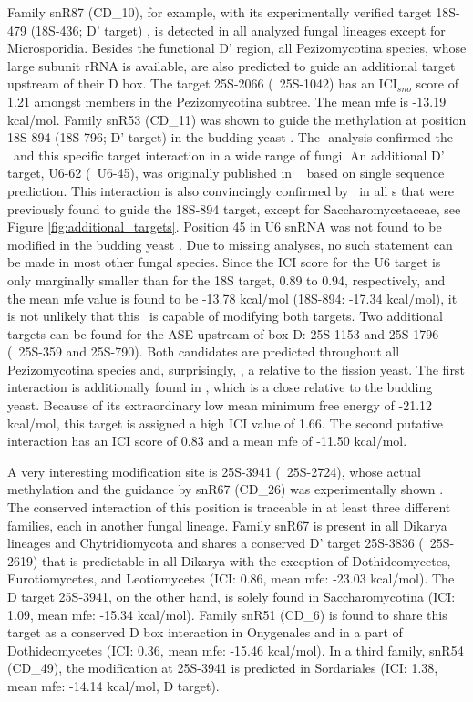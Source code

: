 Family snR87 (CD\_10), for example, with its experimentally verified target
18S-479 (18S-436; D' target) \cite{Davis:2006}, is detected in all analyzed
fungal lineages except for Microsporidia. Besides the functional D' region,
all Pezizomycotina species, whose large subunit rRNA is available, are also
predicted to guide an additional target upstream of their D box. The target
25S-2066 (\ncr\ 25S-1042) has an ICI$_{sno}$ score of 1.21 amongst members
in the Pezizomycotina subtree. The mean mfe is -13.19 kcal/mol.  Family
snR53 (CD\_11) was shown to guide the methylation at position 18S-894
(18S-796; D' target) in the budding yeast \cite{Lowe:1999}. The
\snostrip-analysis confirmed the \sno\ and this specific target interaction
in a wide range of fungi. An additional D' target, U6-62 (\sce\ U6-45), was
originally published in \ncr\ \cite{Liu:2009} based on single sequence
prediction. This interaction is also convincingly confirmed by \snostrip\
in all \sno s that were previously found to guide the 18S-894 target,
except for Saccharomycetaceae, see Figure
\ref{fig:additional_targets}. Position 45 in U6 snRNA was not found to be
modified in the budding yeast \cite{Machnicka:2013, Massenet:1998}. Due to
missing analyses, no such statement can be made in most other fungal
species. Since the ICI score for the U6 target is only marginally smaller
than for the 18S target, 0.89 to 0.94, respectively, and the mean mfe value
is found to be -13.78 kcal/mol (18S-894: -17.34 kcal/mol), it is not
unlikely that this \sno\ is capable of modifying both targets. Two
additional targets can be found for the ASE upstream of box D: 25S-1153 and
25S-1796 (\ncr\ 25S-359 and 25S-790). Both candidates are predicted
throughout all Pezizomycotina species and, surprisingly, \Tde, a relative
to the fission yeast. The first interaction is additionally found in \Yli,
which is a close relative to the budding yeast. Because of its
extraordinary low mean minimum free energy of -21.12 kcal/mol, this target
is assigned a high ICI value of 1.66. The second putative interaction has
an ICI score of 0.83 and a mean mfe of -11.50 kcal/mol.

A very interesting modification site is 25S-3941 (\sce\ 25S-2724), whose
actual methylation and the guidance by snR67 (CD\_26) was experimentally
shown \cite{Lowe:1999}. The conserved interaction of this position is
traceable in at least three different families, each in another fungal
lineage. Family snR67 is present in all Dikarya lineages and
Chytridiomycota and shares a conserved D' target 25S-3836 (\sce\ 25S-2619)
that is predictable in all Dikarya with the exception of
Dothideomycetes, Eurotiomycetes, and Leotiomycetes (ICI: 0.86, mean mfe:
-23.03 kcal/mol). The D target 25S-3941, on the other hand, is solely found
in Saccharomycotina (ICI: 1.09, mean mfe: -15.34 kcal/mol). Family snR51
(CD\_6) is found to share this target as a conserved D box interaction in
Onygenales and in a part of Dothideomycetes (ICI: 0.36, mean mfe: -15.46
kcal/mol). In a third family, snR54 (CD\_49), the modification at 25S-3941
is predicted in Sordariales (ICI: 1.38, mean mfe: -14.14 kcal/mol, D
target).

